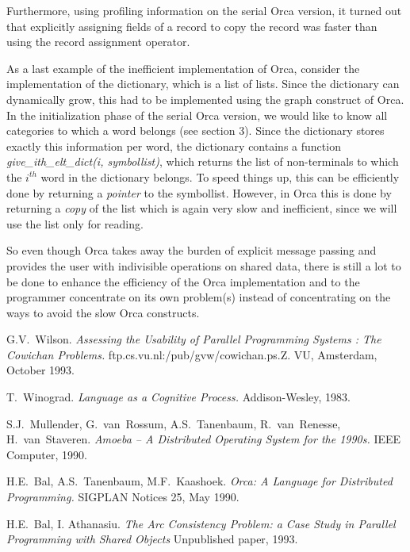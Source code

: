 Furthermore, using profiling information on the serial Orca version,
it turned out that explicitly assigning fields of a record to
copy the record was faster than using the record assignment operator. 

As a last example of the inefficient implementation of Orca,
consider the implementation of the dictionary, which is a list of
lists. Since the dictionary can dynamically grow, this had to be
implemented using the graph construct of Orca. In the initialization
phase of the serial Orca version, we would like to know all categories
to which a word belongs (see section 3). Since the dictionary stores
exactly this information per word, the dictionary contains a function
{\em give\_ith\_elt\_dict(i, symbollist)}, which returns the list of
non-terminals to which the $i^{th}$ word in the dictionary belongs. To
speed things up, this can be efficiently done by returning a {\em
pointer} to the symbollist. However, in Orca this is done by returning
a {\em copy} of the list which is again very slow and inefficient,
since we will use the list only for reading.

So even though Orca takes away the burden of explicit message passing
and provides the user with indivisible operations on shared data,
there is still a lot to be done to enhance the efficiency of the Orca
implementation and to the programmer concentrate on its own
problem(s) instead of concentrating on the ways to avoid the slow Orca
constructs.


\begin{thebibliography}{99}

   G.V.~Wilson.
   {\em Assessing the Usability of Parallel Programming Systems : The
   Cowichan Problems.}
   ftp.cs.vu.nl:/pub/gvw/cowichan.ps.Z.
   VU, Amsterdam, October 1993.

   T.~Winograd.
   {\em Language as a Cognitive Process.}
   Addison-Wesley, 1983.

  S.J.~Mullender, G.~van~Rossum, A.S.~Tanenbaum, R.~van~Renesse, H.~van~Staveren.
  {\em Amoeba -- A Distributed Operating System for the 1990s.}
  IEEE Computer, 1990.

  H.E.~Bal, A.S.~Tanenbaum, M.F.~Kaashoek.
  {\em Orca: A Language for Distributed Programming.}
  SIGPLAN Notices 25, May 1990.

  H.E.~Bal, I. Athanasiu.
  {\em The Arc Consistency Problem: a Case Study in Parallel
  Programming with Shared Objects}
  Unpublished paper, 1993.

\end{thebibliography}



